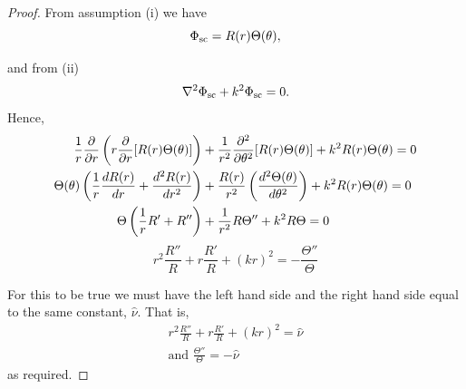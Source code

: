 \begin{proof}
  From assumption (i) we have
  \begin{equation}
      \Phi_{\text{sc}} = R(r) \Theta(\theta),
  \end{equation}\par
  and from (ii)
  \begin{equation}\label{eq:phisc_helmholtz}
      \nabla^2 \Phi_{\text{sc}} + k^2 \Phi_{\text{sc}} = 0.
  \end{equation}
  Hence,
  \begin{align*}
      \frac{1}{r} \frac{\partial }{\partial r}
      \left( r \frac{\partial }{\partial r} [R(r) \Theta(\theta)] \right)
      &+ \frac{1}{r^2} \frac{\partial ^2}{\partial \theta^2} [R(r) \Theta(\theta)]
      + k^2 R(r) \Theta(\theta) = 0 \\
      \Theta(\theta) \left( \frac{1}{r} \frac{dR(r)}{dr} + \frac{d^2 R(r)}{dr^2} \right)
      &+ \frac{R(r)}{r^2} \left( \frac{d^2 \Theta(\theta)}{d\theta^2}\right)
      + k^2 R(r) \Theta(\theta) = 0 \\
      \Theta \left( \frac{1}{r} R' + R''\right)
      &+ \frac{1}{r^2} R \Theta'' + k^2 R \Theta = 0
  \end{align*}
  \begin{equation*}
       r^2 \frac{R''}{R} + r\frac{R'}{R} + (kr)^2 = - \frac{\Theta''}{\Theta}
  \end{equation*}\par
  For this to be true we must have the left hand side and the right hand side equal to the same constant, $\hat{\nu}$. That is,
  \begin{gather*}
    r^2 \frac{R''}{R} + r\frac{R'}{R} + (kr)^2 = \hat{\nu} \\
    \text{and } \frac{\Theta''}{\Theta} = - \hat{\nu}
  \end{gather*}
  as required.
\end{proof}


